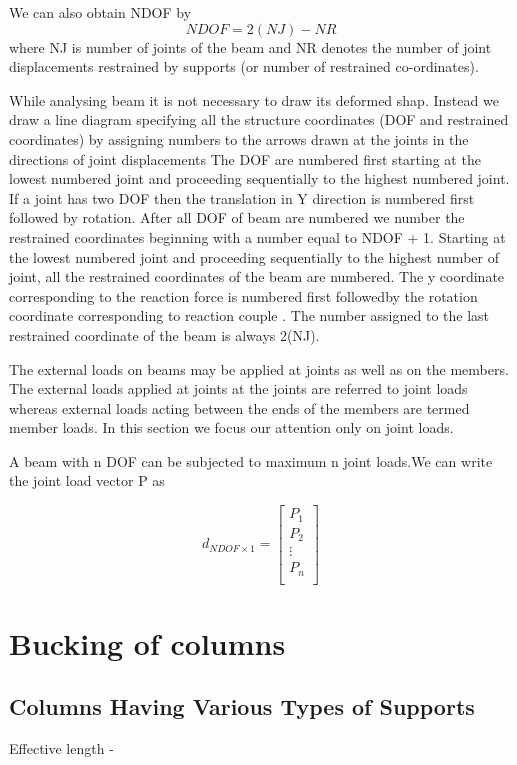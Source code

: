 \documentclass{report}
\begin{document}
We can also obtain NDOF by 
\[NDOF = 2(NJ) - NR\]
where NJ is number of joints of the beam and NR denotes the number of joint 
displacements restrained by supports (or number of restrained co-ordinates).

While analysing beam it is not necessary to draw its deformed shap. Instead we draw
a line diagram specifying all the structure coordinates (DOF and restrained coordinates)
by assigning numbers to the arrows drawn at the joints in the directions of joint displacements
The DOF are numbered first starting at the lowest numbered joint and proceeding sequentially
to the highest numbered joint. If a joint has two DOF then the translation in Y direction
is numbered first followed by rotation. After all DOF of beam are numbered we number the 
restrained coordinates beginning with a number equal to NDOF + 1. Starting at the lowest 
numbered joint and proceeding sequentially to the highest number of joint, all the 
restrained coordinates of the beam are numbered. The y coordinate corresponding
to the reaction force is numbered first followedby the rotation coordinate 
corresponding to reaction couple . The number assigned to the last restrained coordinate
of the beam is always 2(NJ).

The external loads on beams may be applied at joints as well as on the members. The 
external loads applied at joints at the joints are referred to joint loads whereas
external loads acting between the ends of the members are termed member loads. In this
section we focus our attention only on joint loads.

A beam with n DOF can be subjected to maximum n joint loads.We can write the joint 
load vector P as 

\[
  d_{NDOF\times1} =
  \left[ {\begin{array}{c}
    P_1 \\
    P_2 \\
    \vdots \\
    P_n \\
  \end{array} } \right]
\]




\chapter{Bucking of columns}
\section{Columns Having Various Types of Supports}
Effective length - 
\end{document}
